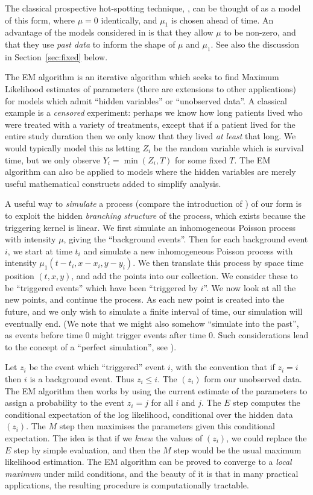 \documentclass[twoside,a4paper]{article}
\theoremstyle{plain}
\theoremstyle{definition}
\begin{document}
The classical prospective hot-spotting technique, \cite{bjp}, can be thought of as a model
of this form, where $\mu=0$ identically, and $\mu_1$ is chosen ahead of time.  An
advantage of the models considered in \cite{sepp, sepp2} is that they allow $\mu$ to be
non-zero, and that they use \emph{past data} to inform the shape of $\mu$ and $\mu_1$.
See also the discussion in Section~\ref{sec:fixed} below.

The EM algorithm is an iterative algorithm which seeks to find Maximum Likelihood estimates
of parameters (there are extensions to other applications) for models which admit ``hidden
variables'' or ``unobserved data''.  A classical example is a \emph{censored} experiment:
perhaps we know how long patients lived who were treated with a variety of treatments, except
that if a patient lived for the entire study duration then we only know that
they lived \emph{at least} that long.  We would typically model this as letting $Z_i$ be
the random variable which is survival time, but we only observe $Y_i = \min(Z_i, T)$ for
some fixed $T$.  The EM algorithm can also be applied to models where the hidden variables
are merely useful mathematical constructs added to simplify analysis.

A useful way to \emph{simulate} a process (compare the introduction of \cite{mr, mr1})
of our form is to exploit the hidden
\emph{branching structure} of the process, which exists because the triggering
kernel is linear.  We first simulate an inhomogeneous Poisson process with intensity $\mu$,
giving the ``background events''.  Then for each background event $i$, we start at time $t_i$
and simulate a new inhomogeneous Poisson process with intensity $\mu_1(t-t_i, x-x_i, y-y_i)$.
We then translate this process by space time position $(t,x,y)$, and add the points into our
collection.  We consider these to be ``triggered events'' which have been ``triggered by $i$''.
We now look at all the new points, and continue the process.  As each new point
is created into the future, and we only wish to simulate a finite interval of time, our
simulation will eventually end.  (We note that we might also somehow ``simulate into the past'',
as events before time $0$ might trigger events after time $0$.  Such considerations lead to
the concept of a ``perfect simulation'', see \cite{mr}).

Let $z_i$ be the event which ``triggered'' event $i$, with the convention that if $z_i=i$
then $i$ is a background event.  Thus $z_i \leq i$.  The $(z_i)$ form our unobserved data.
The EM algorithm then works by using the current estimate of the parameters to assign a
probability to the event $z_i=j$ for all $i$ and $j$.  The $E$ step computes the conditional
expectation of the log likelihood, conditional over the hidden data $(z_i)$.  The $M$ step
then maximises the parameters given this conditional expectation.  The idea is that if
we \emph{knew} the values of $(z_i)$, we could replace the $E$ step by simple evaluation,
and then the $M$ step would be the usual maximum likelihood estimation.
The EM algorithm can be proved to converge to a \emph{local maximum} under mild conditions,
and the beauty of it is that in many practical applications, the resulting procedure is
computationally tractable.
\end{document}

